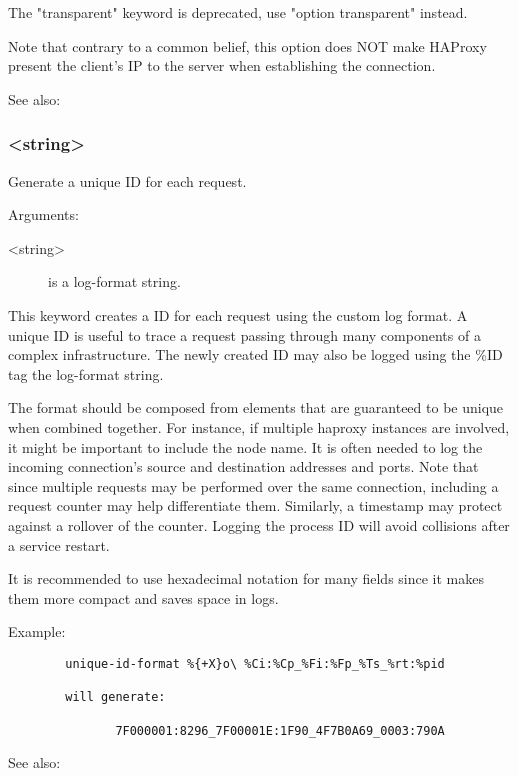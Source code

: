 {  The "transparent" keyword is deprecated, use "option transparent" instead.

  Note that contrary to a common belief, this option does NOT make HAProxy
  present the client's IP to the server when establishing the connection.

  See also: 

\subsubsection[unique-id-format]{ <string>}

  Generate a unique ID for each request.


  Arguments:
  \begin{description}
  \item[<string>] is a log-format string.
  \end{description}

  This keyword creates a ID for each request using the custom log format. A
  unique ID is useful to trace a request passing through many components of
  a complex infrastructure. The newly created ID may also be logged using the
  \%ID tag the log-format string.

  The format should be composed from elements that are guaranteed to be
  unique when combined together. For instance, if multiple haproxy instances
  are involved, it might be important to include the node name. It is often
  needed to log the incoming connection's source and destination addresses
  and ports. Note that since multiple requests may be performed over the same
  connection, including a request counter may help differentiate them.
  Similarly, a timestamp may protect against a rollover of the counter.
  Logging the process ID will avoid collisions after a service restart.

  It is recommended to use hexadecimal notation for many fields since it
  makes them more compact and saves space in logs.

  Example:
  \begin{verbatim}
        unique-id-format %{+X}o\ %Ci:%Cp_%Fi:%Fp_%Ts_%rt:%pid

        will generate:

               7F000001:8296_7F00001E:1F90_4F7B0A69_0003:790A
  \end{verbatim}

  See also: 

}
